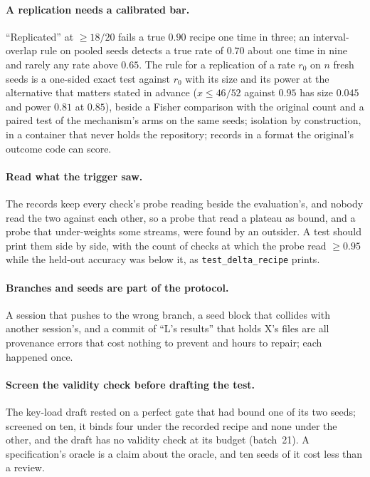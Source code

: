 \documentclass[11pt]{article}
\begin{document}
\paragraph{A replication needs a calibrated bar.} ``Replicated'' at $\geq 18/20$ fails a true $0.90$ recipe one time in three; an interval-overlap rule on pooled seeds detects a true rate of $0.70$ about one time in nine and rarely any rate above $0.65$. The rule for a replication of a rate $r_0$ on $n$ fresh seeds is a one-sided exact test against $r_0$ with its size and its power at the alternative that matters stated in advance ($x \leq 46/52$ against $0.95$ has size $0.045$ and power $0.81$ at $0.85$), beside a Fisher comparison with the original count and a paired test of the mechanism's arms on the same seeds; isolation by construction, in a container that never holds the repository; records in a format the original's outcome code can score.

\paragraph{Read what the trigger saw.} The records keep every check's probe reading beside the evaluation's, and nobody read the two against each other, so a probe that read a plateau as bound, and a probe that under-weights some streams, were found by an outsider. A test should print them side by side, with the count of checks at which the probe read $\geq 0.95$ while the held-out accuracy was below it, as \texttt{test\_delta\_recipe} prints.

\paragraph{Branches and seeds are part of the protocol.} A session that pushes to the wrong branch, a seed block that collides with another session's, and a commit of ``L's results'' that holds X's files are all provenance errors that cost nothing to prevent and hours to repair; each happened once.

\paragraph{Screen the validity check before drafting the test.} The key-load draft rested on a perfect gate that had bound one of its two seeds; screened on ten, it binds four under the recorded recipe and none under the other, and the draft has no validity check at its budget (batch~21). A specification's oracle is a claim about the oracle, and ten seeds of it cost less than a review.
\end{document}
